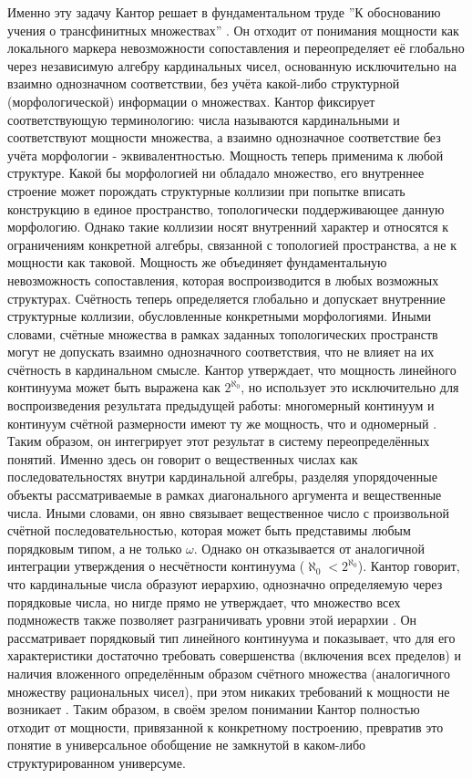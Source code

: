 \documentclass[12pt]{article}
\begin{document}
Именно эту задачу Кантор решает в фундаментальном труде ''К обоснованию учения о трансфинитных множествах'' \cite{cantor-transfinite}. Он отходит от понимания мощности как локального маркера невозможности сопоставления и переопределяет её глобально через независимую алгебру кардинальных чисел, основанную исключительно на взаимно однозначном соответствии, без учёта какой-либо структурной (морфологической) информации о множествах. Кантор фиксирует соответствующую терминологию: числа называются кардинальными и соответствуют мощности множества, а взаимно однозначное соответствие без учёта морфологии - эквивалентностью. Мощность теперь применима к любой структуре. Какой бы морфологией ни обладало множество, его внутреннее строение может порождать структурные коллизии при попытке вписать конструкцию в единое пространство, топологически поддерживающее данную морфологию. Однако такие коллизии носят внутренний характер и относятся к ограничениям конкретной алгебры, связанной с топологией пространства, а не к мощности как таковой. Мощность же объединяет фундаментальную невозможность сопоставления, которая воспроизводится в любых возможных структурах. Счётность теперь определяется глобально и допускает внутренние структурные коллизии, обусловленные конкретными морфологиями. Иными словами, счётные множества в рамках заданных топологических пространств могут не допускать взаимно однозначного соответствия, что не влияет на их счётность в кардинальном смысле. Кантор утверждает, что мощность линейного континуума может быть выражена как $2^{\aleph_0}$, но использует это исключительно для воспроизведения результата предыдущей работы: многомерный континуум и континуум счётной размерности имеют ту же мощность, что и одномерный \cite{cantor-multicontinuum}. Таким образом, он интегрирует этот результат в систему переопределённых понятий. Именно здесь он говорит о вещественных числах как последовательностях внутри кардинальной алгебры, разделяя упорядоченные объекты рассматриваемые в рамках диагонального аргумента и вещественные числа. Иными словами, он явно связывает вещественное число с произвольной счётной последовательностью, которая может быть представимы любым порядковым типом, а не только $\omega$. Однако он отказывается от аналогичной интеграции утверждения о несчётности континуума ($\aleph_0 < 2^{\aleph_0}$). Кантор говорит, что кардинальные числа образуют иерархию, однозначно определяемую через порядковые числа, но нигде прямо не утверждает, что множество всех подмножеств также позволяет разграничивать уровни этой иерархии \cite{cantor-cardinal-hierarchy}. Он рассматривает порядковый тип линейного континуума и показывает, что для его характеристики достаточно требовать совершенства (включения всех пределов) и наличия вложенного определённым образом счётного множества (аналогичного множеству рациональных чисел), при этом никаких требований к мощности не возникает \cite{cantor-continuum-order}. Таким образом, в своём зрелом понимании Кантор полностью отходит от мощности, привязанной к конкретному построению, превратив это понятие в универсальное обобщение не замкнутой в каком-либо структурированном универсуме.
\end{document}
